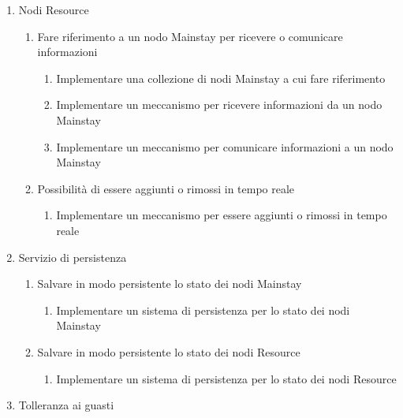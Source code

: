 \begin{enumerate}
\begin{enumerate}
\begin{enumerate}
                    \end{enumerate}
          \end{enumerate}
    \item Nodi Resource
          \begin{enumerate}
              \item Fare riferimento a un nodo Mainstay per ricevere o comunicare informazioni
                    \begin{enumerate}
                        \item Implementare una collezione di nodi Mainstay a cui fare riferimento
                        \item Implementare un meccanismo per ricevere informazioni da un nodo Mainstay
                        \item Implementare un meccanismo per comunicare informazioni a un nodo Mainstay
                    \end{enumerate}
              \item Possibilità di essere aggiunti o rimossi in tempo reale
                    \begin{enumerate}
                        \item Implementare un meccanismo per essere aggiunti o rimossi in tempo reale
                    \end{enumerate}
          \end{enumerate}
    \item Servizio di persistenza
          \begin{enumerate}
              \item Salvare in modo persistente lo stato dei nodi Mainstay
                    \begin{enumerate}
                        \item Implementare un sistema di persistenza per lo stato dei nodi Mainstay
                    \end{enumerate}
              \item Salvare in modo persistente lo stato dei nodi Resource
                    \begin{enumerate}
                        \item Implementare un sistema di persistenza per lo stato dei nodi Resource
                    \end{enumerate}
          \end{enumerate}
    \item Tolleranza ai guasti
          \begin{enumerate}

\end{enumerate}
\end{enumerate}

